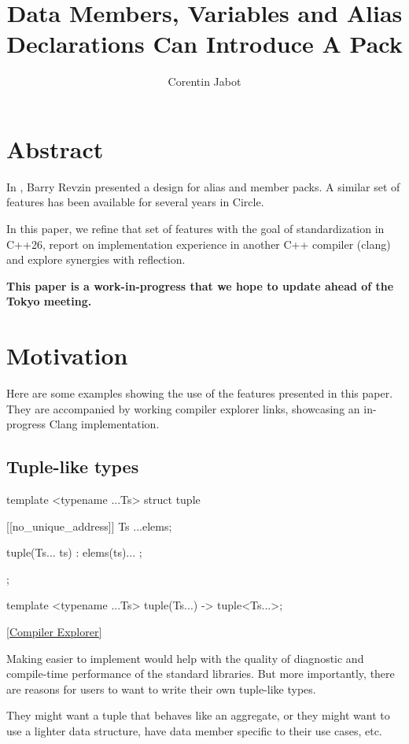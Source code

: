 \documentclass{wg21}
\title{Data Members, Variables and Alias Declarations Can Introduce A Pack}
\author{Corentin Jabot}{corentin.jabot@gmail.com}
\begin{document}
\maketitle

\section{Abstract}

In , Barry Revzin presented a design for alias and member packs.
A similar set of features has been available for several years in Circle.

In this paper, we refine that set of features with the goal of standardization in C++26, report on implementation experience
in another C++ compiler (clang) and explore synergies with reflection.

\textbf{This paper is a work-in-progress that we hope to update ahead of the Tokyo meeting.}

\section{Motivation}

Here are some examples showing the use of the features presented in this paper.
They are accompanied by working compiler explorer links, showcasing an in-progress Clang implementation.

\subsection{Tuple-like types}

\begin{colorblock}
template <typename ...Ts>
struct tuple {
    [[no_unique_address]]  Ts ...elems;

    tuple(Ts... ts) : elems(ts)... {};
};

template <typename ...Ts>
tuple(Ts...) -> tuple<Ts...>;
\end{colorblock}

\href{https://compiler-explorer.com/z/e954x5v6a}{[Compiler Explorer]}

Making  easier to implement would help with the quality of diagnostic and compile-time performance of the standard libraries.
But more importantly, there are reasons for users to want to write their own tuple-like types.

They might want a tuple that behaves like an aggregate, or they might want to use a lighter data structure, have data member specific to their use cases,
etc.
\end{document}
